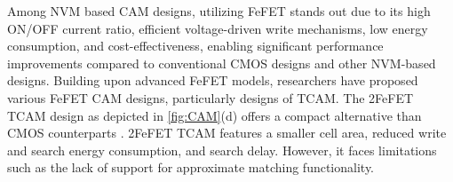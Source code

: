 Among NVM based CAM designs, utilizing FeFET stands out due to its high ON/OFF current ratio, efficient voltage-driven write mechanisms, low energy consumption, and cost-effectiveness, enabling significant performance improvements compared to conventional CMOS designs and other NVM-based designs. Building upon advanced FeFET models, researchers have proposed various FeFET CAM designs, particularly designs of TCAM. 
The 2FeFET TCAM design as depicted in \autoref{fig:CAM}(d) offers a compact alternative than CMOS counterparts \cite{2FeFET}. 2FeFET TCAM features a smaller cell area, reduced write and search energy consumption, and search delay. 
However, it faces limitations such as the lack of support for approximate matching functionality. 





